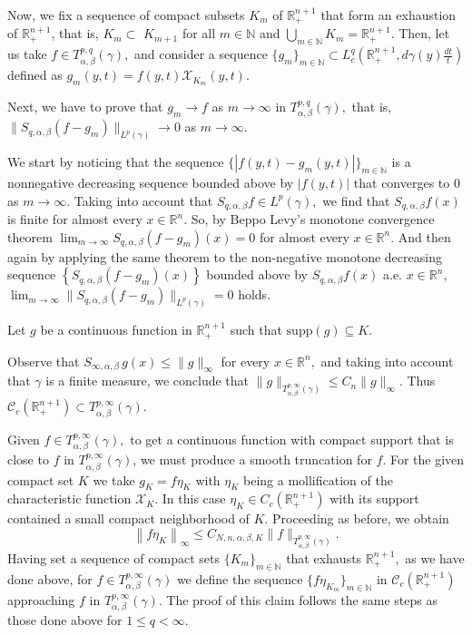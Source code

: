 \documentclass[leqno,11pt]{amsart}
\theoremstyle{plain}
\theoremstyle{remark}
\begin{document}
{{{Now, we fix a sequence of compact subsets $K_m$ of $\mathbb{R}^{n+1}_+$ that form an exhaustion of $\mathbb{R}_{+}^{n+1}$, that is, $K_m \subset$ $K_{m+1}$ for all $m \in \mathbb{N}$ and $\bigcup_{m \in \mathbb{N}} K_m=\mathbb{R}_{+}^{n+1}$. Then, let us
take $f\in T^{p,q}_{\alpha,\beta}(\gamma),$ and consider a sequence $\{g_m\}_{m\in {\mathbb N}}\subset L^{q}_c(\mathbb{R}^{n+1}_+, d\gamma(y)\frac{dt}{t})$ defined as $g_m(y,t)=f(y,t)\mathcal{X}_{K_m}(y,t).$ 

Next, we have to prove that $g_m\to f$ as $m\to \infty$ in $T^{p,q}_{\alpha, \beta}(\gamma),$ that is, $\|S_{q,\alpha, \beta}(f-g_m)\|_{L^p(\gamma)}\to 0$ as $m\to \infty.$  

We start by noticing that the sequence $\{|f(y,t)-g_m(y,t)|\}_{m\in \mathbb{N}}$ is a nonnegative decreasing sequence bounded above by $|f(y,t)|$ that converges to $0$ as $m\to \infty.$ Taking into account that $S_{q,\alpha, \beta} f\in L^p(\gamma),$ we find that $S_{q,\alpha, \beta} f(x)$ is finite for almost every $x\in \mathbb{R}^n.$ So, by Beppo Levy's monotone convergence theorem $\lim_{m\to \infty}S_{q,\alpha,\beta}(f-g_m)(x)=0$
for almost every $x\in \mathbb{R}^n.$ And then again by applying the same theorem to the non-negative monotone decreasing sequence $\left\{S_{q,\alpha,\beta}(f-g_m)(x)\right\}$
bounded above by
$S_{q,\alpha, \beta}f(x)$ a.e. $x\in \mathbb{R}^n$, $\lim_{m\to \infty}\|S_{q,\alpha, \beta}(f-g_m)\|_{L^p(\gamma)}=0$ holds. 



Let $g$ be a continuous function in $\mathbb{R}^{n+1}_+$ such that $\text{supp} (g)\subseteq K$. 

Observe that $S_{\infty, \alpha, \beta}\, g(x)\le \|g\|_\infty$ for every $x\in \mathbb{R}^n,$  and taking into account that $\gamma$ is a finite measure, we conclude that $\|g\|_{T^{p,\infty}_{\alpha, \beta}(\gamma)}\le C_n \|g\|_\infty.$
Thus $\mathscr{C}_c(\mathbb{R}^{n+1}_+)\subset T^{p,\infty}_{\alpha, \beta}(\gamma).$

Given $f\in T^{p,\infty}_{\alpha, \beta}(\gamma),$ to get a continuous function with compact support that is close to $f$ in $T^{p,\infty}_{\alpha, \beta}(\gamma)$, we must produce a smooth truncation for $f$. For the given compact set $K$ we take $g_K=f\eta_K$ with $\eta_K$ being a mollification of the characteristic function $\mathcal{X}_K.$ In this case $\eta_K\in C_c(\mathbb{R}^{n+1}_+)$ with its support contained a small compact neighborhood of $K.$  
Proceeding as before, 
we obtain
$$
\left\|f \eta_K\right\|_{\infty}  \le C_{N,n,\alpha, \beta, K}\|f\|_{T^{p, \infty}_{\alpha, \beta}(\gamma)}.
$$
Having set a sequence of compact sets $\{K_m\}_{m\in {\mathbb N}} $ that exhausts $\mathbb{R}^{n+1}_+,$ as we have done above, for $f\in T^{p,\infty}_{\alpha, \beta}(\gamma)$ we define the sequence $\{f\eta_{K_m}\}_{m\in {\mathbb N}}$ in $\mathscr{C}_{c}(\mathbb{R}^{n+1}_+)$ approaching $f$ in $T^{p,\infty}_{\alpha, \beta}(\gamma)$. The proof of this claim follows the same steps as those done above for $1\le q<\infty.$


}}}
\end{document}
